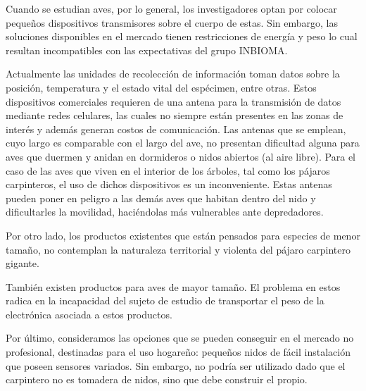 %

%


Cuando se estudian aves, por lo general, los investigadores optan por colocar pequeños dispositivos transmisores sobre el cuerpo de estas. Sin embargo, las soluciones disponibles en el mercado tienen restricciones de energía y peso lo cual resultan incompatibles con las expectativas del grupo INBIOMA.

Actualmente las unidades de recolección de información toman datos sobre la posición, temperatura y el estado vital del espécimen, entre otras. Estos dispositivos comerciales requieren de una antena para la transmisión de datos mediante redes celulares, las cuales no siempre están presentes en las zonas de interés y además generan costos de comunicación. Las antenas que se emplean, cuyo largo es comparable con el largo del ave, no presentan dificultad alguna para aves que duermen y anidan en dormideros o nidos abiertos (al aire libre). Para el caso de las aves que viven en el interior de los árboles, tal como los pájaros carpinteros, el uso de dichos dispositivos es un inconveniente. Estas antenas pueden poner en peligro a las demás aves que habitan dentro del nido y dificultarles la movilidad, haciéndolas más vulnerables ante depredadores.

Por otro lado, los productos existentes que están pensados para especies de menor tamaño, no contemplan la naturaleza territorial y violenta del pájaro carpintero gigante.

También existen productos para aves de mayor tamaño. El problema en estos radica en la incapacidad del sujeto de estudio de transportar el peso de la electrónica asociada a estos productos.

Por último, consideramos las opciones que se pueden conseguir en el mercado no profesional, destinadas para el uso hogareño: pequeños nidos de fácil instalación que poseen sensores variados. Sin embargo, no podría ser utilizado dado que el carpintero no es tomadera de nidos, sino que debe construir el propio. 


